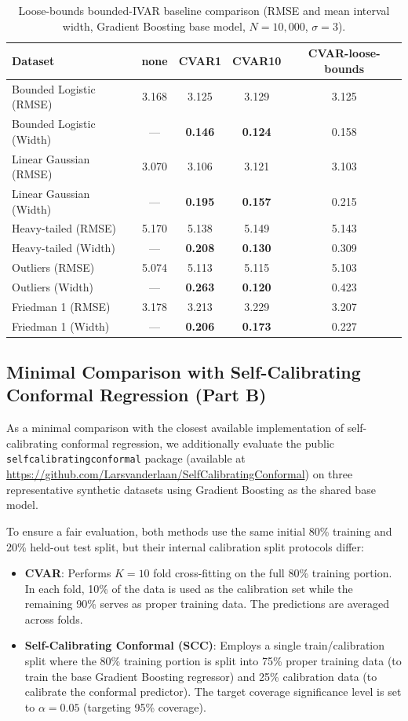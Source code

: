 \documentclass{article}
\begin{document}
\begin{table}[htbp]
\centering
\caption{Loose-bounds bounded-IVAR baseline comparison (RMSE and mean interval width, Gradient Boosting base model, $N=10,000$, $\sigma=3$).}
\label{tab:loose_bounds}
\begin{tabular}{lcccc}
\toprule
Dataset & none & CVAR1 & CVAR10 & CVAR-loose-bounds \\
\midrule
Bounded Logistic (RMSE) & 3.168 & 3.125 & 3.129 & 3.125 \\
Bounded Logistic (Width) & — & \textbf{0.146} & \textbf{0.124} & 0.158 \\
\midrule
Linear Gaussian (RMSE) & 3.070 & 3.106 & 3.121 & 3.103 \\
Linear Gaussian (Width) & — & \textbf{0.195} & \textbf{0.157} & 0.215 \\
\midrule
Heavy-tailed (RMSE) & 5.170 & 5.138 & 5.149 & 5.143 \\
Heavy-tailed (Width) & — & \textbf{0.208} & \textbf{0.130} & 0.309 \\
\midrule
Outliers (RMSE) & 5.074 & 5.113 & 5.115 & 5.103 \\
Outliers (Width) & — & \textbf{0.263} & \textbf{0.120} & 0.423 \\
\midrule
Friedman 1 (RMSE) & 3.178 & 3.213 & 3.229 & 3.207 \\
Friedman 1 (Width) & — & \textbf{0.206} & \textbf{0.173} & 0.227 \\
\bottomrule
\end{tabular}
\end{table}

\subsection{Minimal Comparison with Self-Calibrating Conformal Regression (Part B)}

As a minimal comparison with the closest available implementation of self-calibrating conformal regression, we additionally evaluate the public \texttt{selfcalibratingconformal} package (available at \url{https://github.com/Larsvanderlaan/SelfCalibratingConformal}) on three representative synthetic datasets using Gradient Boosting as the shared base model. 

To ensure a fair evaluation, both methods use the same initial 80\% training and 20\% held-out test split, but their internal calibration split protocols differ:
\begin{itemize}
    \item \textbf{CVAR}: Performs $K=10$ fold cross-fitting on the full 80\% training portion. In each fold, 10\% of the data is used as the calibration set while the remaining 90\% serves as proper training data. The predictions are averaged across folds.
    \item \textbf{Self-Calibrating Conformal (SCC)}: Employs a single train/calibration split where the 80\% training portion is split into 75\% proper training data (to train the base Gradient Boosting regressor) and 25\% calibration data (to calibrate the conformal predictor). The target coverage significance level is set to $\alpha = 0.05$ (targeting 95\% coverage).
\end{itemize}
\end{document}
